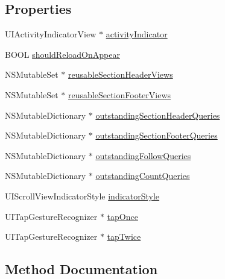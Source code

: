 \subsection*{Properties}
\begin{DoxyCompactItemize}
\item 
U\+I\+Activity\+Indicator\+View $\ast$ \hyperlink{interface_e_s_photo_timeline_view_controller_ad10d81b63a4d77ee719e666f18ef9b0a}{activity\+Indicator}
\item 
B\+O\+O\+L \hyperlink{interface_e_s_photo_timeline_view_controller_a9b1ebe8df6266603edf00e80b2e1fd0c}{should\+Reload\+On\+Appear}
\item 
N\+S\+Mutable\+Set $\ast$ \hyperlink{interface_e_s_photo_timeline_view_controller_a854c0e9181fc4c66580e58ee8df9929f}{reusable\+Section\+Header\+Views}
\item 
N\+S\+Mutable\+Set $\ast$ \hyperlink{interface_e_s_photo_timeline_view_controller_a58444bc49def717ffe42bb3b39b7db04}{reusable\+Section\+Footer\+Views}
\item 
N\+S\+Mutable\+Dictionary $\ast$ \hyperlink{interface_e_s_photo_timeline_view_controller_a50a3992446f399c0bdbd7d03888e75ee}{outstanding\+Section\+Header\+Queries}
\item 
N\+S\+Mutable\+Dictionary $\ast$ \hyperlink{interface_e_s_photo_timeline_view_controller_a9fdca4ea7fd64a895ef967d29895a1a8}{outstanding\+Section\+Footer\+Queries}
\item 
N\+S\+Mutable\+Dictionary $\ast$ \hyperlink{interface_e_s_photo_timeline_view_controller_a83f2bdda79d2b985b905bca4759af1d6}{outstanding\+Follow\+Queries}
\item 
N\+S\+Mutable\+Dictionary $\ast$ \hyperlink{interface_e_s_photo_timeline_view_controller_a62b8fec88731eda955500b97756643d5}{outstanding\+Count\+Queries}
\item 
U\+I\+Scroll\+View\+Indicator\+Style \hyperlink{interface_e_s_photo_timeline_view_controller_a7f2b7d975c9b073383bd348bb31d4505}{indicator\+Style}
\item 
U\+I\+Tap\+Gesture\+Recognizer $\ast$ \hyperlink{interface_e_s_photo_timeline_view_controller_a10c056efa7e26d8f4275aa67d6fc9b0b}{tap\+Once}
\item 
U\+I\+Tap\+Gesture\+Recognizer $\ast$ \hyperlink{interface_e_s_photo_timeline_view_controller_a173f7f4c7ded326bc033ca82fb5bd98c}{tap\+Twice}
\end{DoxyCompactItemize}


\subsection{Method Documentation}
\hypertarget{interface_e_s_photo_timeline_view_controller_aea3af8706e136c64c40d3f621c3c582d}{}
